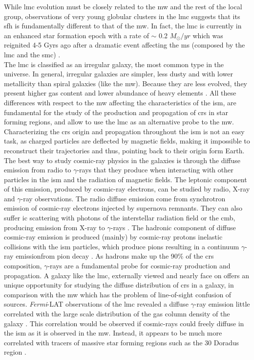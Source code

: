 \documentclass[main.tex]{subfiles}
\begin{document}
While \gls{lmc} evolution must  be closely related to the \gls{mw} and the rest of the local group, observations of very young globular clusters in the \gls{lmc} suggests that its \gls{sfh} is fundamentally different to that of the \gls{mw}. In fact, the \gls{lmc} is currently in an enhanced star formation epoch with a rate of $\sim$ 0.2 $M_{\odot}/yr$ which was reignited 4-5 Gyrs ago after a dramatic event affecting the \gls{ms} (composed by the \gls{lmc} and the \gls{smc}) \cite{2009SFHofLMC}.\\
The \gls{lmc} is classified as an irregular galaxy, the most common type in the universe. In general, irregular galaxies are simpler, less dusty and with lower metallicity than spiral galaxies (like the \gls{mw}). Because they are less evolved, they present higher gas content and lower abundance of heavy elements \cite{2013InfrarredLMC}. All these differences with respect to the \gls{mw} affecting the characteristics of the \gls{ism}, are fundamental for the study of the production and propagation of \glspl{cr} in star forming regions, and allow to use the \gls{lmc} as an alternative probe to the \gls{mw}.
Characterizing the \glspl{cr} origin and propagation throughout the \gls{ism} is not an easy task, as charged particles are deflected by magnetic fields, making it impossible to reconstruct their trajectories and thus, pointing back to their origin form Earth. The best way to study cosmic-ray physics in the galaxies is through the diffuse emission from radio to $\gamma$-rays that they produce when interacting with other particles in the \gls{ism} and the radiation of magnetic fields. The leptonic component of this emission, produced by cosmic-ray electrons, can be studied by radio, X-ray and $\gamma$-ray observations. The radio diffuse emission come from synchrotron emission of cosmic-ray electrons injected by supernova remnants. They can also suffer \gls{ic} scattering with photons of the interstellar radiation field or the \gls{cmb}, producing emission from X-ray to $\gamma$-rays \cite{2008ICgammaray}. The hadronic component of diffuse cosmic-ray emission is produced (mainly) by cosmic-ray protons inelastic collisions with the \gls{ism} particles, which produce pions resulting in a continuum $\gamma$-ray emissionfrom pion decay \cite{1963Pimesonsproducegammarays}. As hadrons make up the 90\% of the \glspl{cr} composition, $\gamma$-rays are a fundamental probe for cosmic-ray production and propagation. 
A galaxy like the \gls{lmc}, externally viewed and nearly face on offers an unique opportunity for studying the diffuse distribution of \glspl{cr} in a galaxy, in comparison with the \gls{mw} which has the problem of line-of-sight confusion of sources. \textit{Fermi}-LAT observations of the \gls{lmc} revealed a diffuse $\gamma$-ray emission little correlated with the large scale distribution of the gas column density of the galaxy \cite{2010FermiLATLMC11months}. This correlation would be observed if cosmic-rays could freely diffuse in the \gls{ism} as it is observed in the \gls{mw}. Instead, it appears to be much more correlated with tracers of massive star forming regions such as the 30 Doradus region \cite{2012CRinLMC30Doradus}.\\
\end{document}
